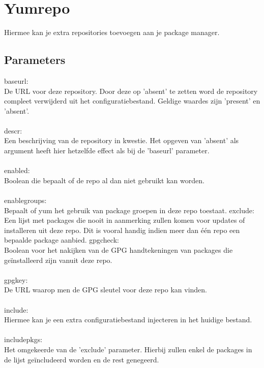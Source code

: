 \section{Yumrepo}

Hiermee kan je extra repositories toevoegen aan je package manager.

\subsection{Parameters}

baseurl:\\
De URL voor deze repository. Door deze op 'absent' te zetten word de repository compleet verwijderd uit het configuratiebestand. Geldige waardes zijn 'present' en 'absent'.\\\\
%
descr:\\
Een beschrijving van de repository in kwestie. Het opgeven van 'absent' als argument heeft hier hetzelfde effect als bij de 'baseurl' parameter.\\\\
%
enabled:\\
Boolean die bepaalt of de repo al dan niet gebruikt kan worden.\\\\
%
enablegroups:\\
Bepaalt of yum het gebruik van package groepen in deze repo toestaat.
%
exclude:\\
Een lijst met packages die nooit in aanmerking zullen komen voor updates of installeren uit deze repo. Dit is vooral handig indien meer dan \'e\'en repo een bepaalde package aanbied.
%
gpgcheck:\\
Boolean voor het nakijken van de GPG handtekeningen van packages die ge\"installeerd zijn vanuit deze repo.\\\\
%
gpgkey:\\
De URL waarop men de GPG sleutel voor deze repo kan vinden.\\\\
%
include:\\
Hiermee kan je een extra configuratiebestand injecteren in het huidige bestand.\\\\
%
includepkgs:\\
Het omgekeerde van de 'exclude' parameter. Hierbij zullen enkel de packages in de lijst ge\"includeerd worden en de rest genegeerd.\\\\
